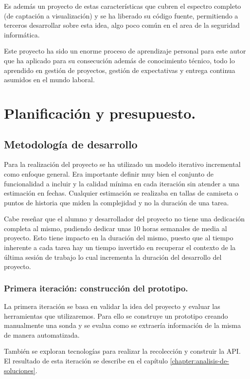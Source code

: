 Es además un proyecto de estas características que cubren el espectro completo (de captación a visualización) y se ha liberado su código fuente, permitiendo a terceros desarrollar sobre esta idea, algo
poco común en el area de la seguridad informática. 

Este proyecto ha sido un enorme proceso de aprendizaje personal para este autor que ha aplicado para su consecución además de conocimiento técnico, todo lo aprendido
en gestión de proyectos, gestión de expectativas y entrega continua asumidos en el mundo laboral.


\chapter{Planificación y presupuesto.}
\section{Metodología de desarrollo}

Para la realización del proyecto se ha utilizado un modelo iterativo incremental como enfoque general. Era importante definir
muy bien el conjunto de funcionalidad a incluir y la calidad mínima en cada iteración sin atender a una estimación en fechas. 
Cualquier estimación se realizaba en tallas de camiseta o puntos de historia que miden la complejidad y no la duración de una tarea.

Cabe reseñar que el alumno y desarrollador del proyecto no tiene una dedicación completa al mismo, pudiendo dedicar unas 10 horas semanales
de media al proyecto. Esto tiene impacto en la duración del mismo, puesto que al tiempo inherente a cada tarea hay un tiempo
invertido en recuperar el contexto de la última sesión de trabajo lo cual incrementa la duración del desarrollo del proyecto.


\subsection{Primera iteración: construcción del prototipo.}

La primera iteración se basa en validar la idea del proyecto y evaluar las herramientas que utilizaremos. Para ello se construye
un prototipo creando manualmente una sonda  y se evalua como se extraería información de la misma de manera automatizada.

También se exploran tecnologías para realizar la recolección y construir la API. El resultado de esta iteración se describe en
el capítulo \ref{chapter:analisis-de-soluciones}.

